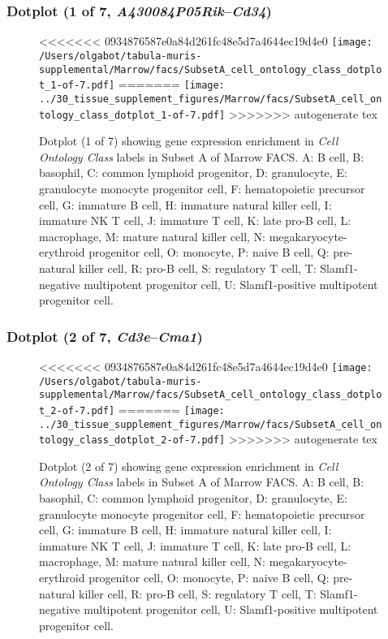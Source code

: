\clearpage

\subsubsection{Dotplot (1 of 7, \emph{A430084P05Rik}--\emph{Cd34})}
\begin{figure}[h]
\centering
<<<<<<< 0934876587e0a84d261fc48e5d7a4644ec19d4e0
\texttt{[image: /Users/olgabot/tabula-muris-supplemental/Marrow/facs/SubsetA\_cell\_ontology\_class\_dotplot\_1-of-7.pdf]}
=======
\texttt{[image: ../30\_tissue\_supplement\_figures/Marrow/facs/SubsetA\_cell\_ontology\_class\_dotplot\_1-of-7.pdf]}
>>>>>>> autogenerate tex

\caption{ Dotplot (1 of 7)  showing gene expression enrichment in \emph{Cell Ontology Class} labels in Subset A of Marrow FACS. A: B cell, B: basophil, C: common lymphoid progenitor, D: granulocyte, E: granulocyte monocyte progenitor cell, F: hematopoietic precursor cell, G: immature B cell, H: immature natural killer cell, I: immature NK T cell, J: immature T cell, K: late pro-B cell, L: macrophage, M: mature natural killer cell, N: megakaryocyte-erythroid progenitor cell, O: monocyte, P: naive B cell, Q: pre-natural killer cell, R: pro-B cell, S: regulatory T cell, T: Slamf1-negative multipotent progenitor cell, U: Slamf1-positive multipotent progenitor cell.}
\end{figure}


\clearpage

\subsubsection{Dotplot (2 of 7, \emph{Cd3e}--\emph{Cma1})}
\begin{figure}[h]
\centering
<<<<<<< 0934876587e0a84d261fc48e5d7a4644ec19d4e0
\texttt{[image: /Users/olgabot/tabula-muris-supplemental/Marrow/facs/SubsetA\_cell\_ontology\_class\_dotplot\_2-of-7.pdf]}
=======
\texttt{[image: ../30\_tissue\_supplement\_figures/Marrow/facs/SubsetA\_cell\_ontology\_class\_dotplot\_2-of-7.pdf]}
>>>>>>> autogenerate tex

\caption{ Dotplot (2 of 7)  showing gene expression enrichment in \emph{Cell Ontology Class} labels in Subset A of Marrow FACS. A: B cell, B: basophil, C: common lymphoid progenitor, D: granulocyte, E: granulocyte monocyte progenitor cell, F: hematopoietic precursor cell, G: immature B cell, H: immature natural killer cell, I: immature NK T cell, J: immature T cell, K: late pro-B cell, L: macrophage, M: mature natural killer cell, N: megakaryocyte-erythroid progenitor cell, O: monocyte, P: naive B cell, Q: pre-natural killer cell, R: pro-B cell, S: regulatory T cell, T: Slamf1-negative multipotent progenitor cell, U: Slamf1-positive multipotent progenitor cell.}
\end{figure}


